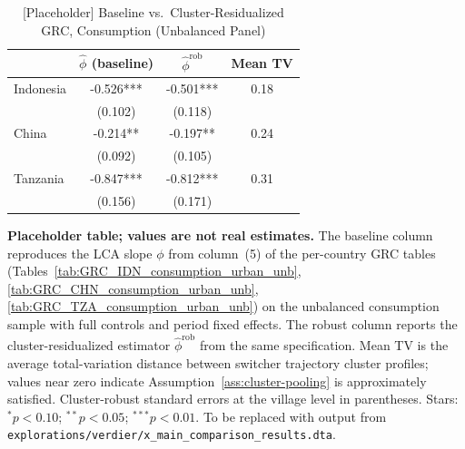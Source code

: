 \begin{table}[htb!] \centering \begin{threeparttable}
\caption{[Placeholder] Baseline vs.\ Cluster-Residualized GRC, Consumption (Unbalanced Panel)}
\label{tab:verdier-robust}
\begin{tabular}{l ccc} \toprule
                       & \multicolumn{1}{c}{$\hat\phi$ (baseline)}
                       & \multicolumn{1}{c}{$\hat\phi^{\mathrm{rob}}$}
                       & \multicolumn{1}{c}{Mean TV} \\
\midrule
Indonesia              & -0.526*** & -0.501*** & 0.18 \\
                       & (0.102)   & (0.118)   &      \\
\addlinespace
China                  & -0.214**  & -0.197**  & 0.24 \\
                       & (0.092)   & (0.105)   &      \\
\addlinespace
Tanzania               & -0.847*** & -0.812*** & 0.31 \\
                       & (0.156)   & (0.171)   &      \\
\bottomrule
\end{tabular}
\begin{tablenotes}[flushleft] \footnotesize
\item{\textbf{Placeholder table; values are not real estimates.} The baseline column reproduces the LCA slope $\phi$ from column~(5) of the per-country GRC tables (Tables~\ref{tab:GRC_IDN_consumption_urban_unb}, \ref{tab:GRC_CHN_consumption_urban_unb}, \ref{tab:GRC_TZA_consumption_urban_unb}) on the unbalanced consumption sample with full controls and period fixed effects. The robust column reports the cluster-residualized estimator $\hat\phi^{\mathrm{rob}}$ from the same specification. Mean TV is the average total-variation distance between switcher trajectory cluster profiles; values near zero indicate Assumption~\ref{ass:cluster-pooling} is approximately satisfied. Cluster-robust standard errors at the village level in parentheses. Stars: $^{*}p<0.10$; $^{**}p<0.05$; $^{***}p<0.01$. To be replaced with output from \texttt{explorations/verdier/x\_main\_comparison\_results.dta}.}
\end{tablenotes} \end{threeparttable} \end{table}
